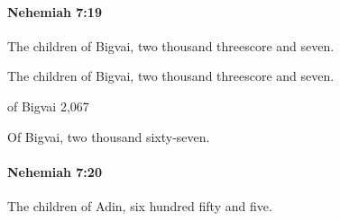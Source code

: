 		\paragraph{Nehemiah 7:19} %
			\label{NEHEMIAH-7-19}

			The children of Bigvai, two thousand threescore and seven.

			\begin{versebox}
					\item[BHS] 
					\item[LXX] 
					\item[ASV] The children of Bigvai, two thousand threescore and seven.
					\item[NIV] of Bigvai 2,067
					\item[NRSV] Of Bigvai, two thousand sixty-seven.
			\end{versebox}

		\paragraph{Nehemiah 7:20} %
			\label{NEHEMIAH-7-20}

			The children of Adin, six hundred fifty and five.

